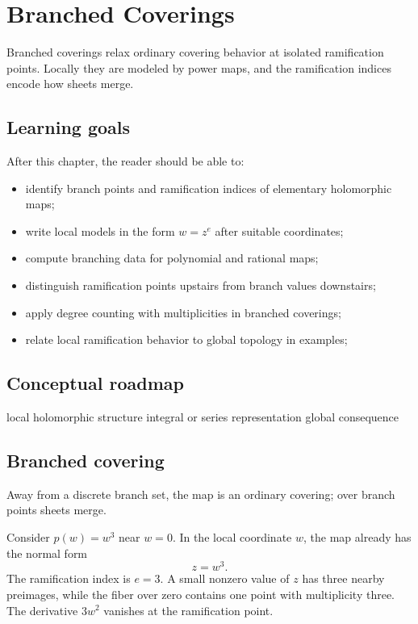 \chapter{Branched Coverings}
\label{ch:iv24}

Branched coverings relax ordinary covering behavior at isolated ramification points. Locally they are modeled by power maps, and the ramification indices encode how sheets merge.

\section*{Learning goals}
After this chapter, the reader should be able to:
\begin{itemize}
\item identify branch points and ramification indices of elementary holomorphic maps;
\item write local models in the form \(w=z^e\) after suitable coordinates;
\item compute branching data for polynomial and rational maps;
\item distinguish ramification points upstairs from branch values downstairs;
\item apply degree counting with multiplicities in branched coverings;
\item relate local ramification behavior to global topology in examples;
\end{itemize}
\section*{Conceptual roadmap}
\volroadmap
  {local holomorphic structure}
  {integral or series representation}
  {global consequence}

\section{Branched covering}
Away from a discrete branch set, the map is an ordinary covering; over branch points sheets merge.

\begin{example}\label{ex:iv24-expand-01}
Consider \(p(w)=w^3\) near \(w=0\). In the local coordinate \(w\), the map already has the normal form
\[
z=w^3.
\]
The ramification index is \(e=3\). A small nonzero value of \(z\) has three nearby preimages, while the fiber over zero contains one point with multiplicity three. The derivative \(3w^2\) vanishes at the ramification point.
\end{example}
